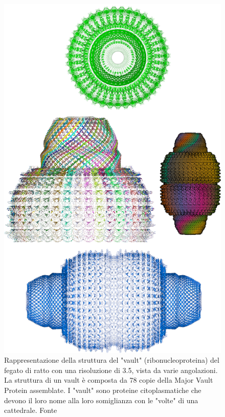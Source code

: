 
\begin{figure}[!htb]
	\centering
	\includegraphics[scale=1.55]{images/4v60_2.png}
	\caption{Rappresentazione della struttura del "vault" (ribonucleoproteina) del fegato di ratto con una risoluzione di 3.5\angstrom, vista da varie angolazioni. La struttura di un vault è composta da 78 copie della Major Vault Protein assemblate. I "vault" sono proteine citoplasmatiche che devono il loro nome alla loro somiglianza con le "volte" di una cattedrale. Fonte\cite{4v60}}
	\label{fig:vault}
\end{figure}


\clearpage